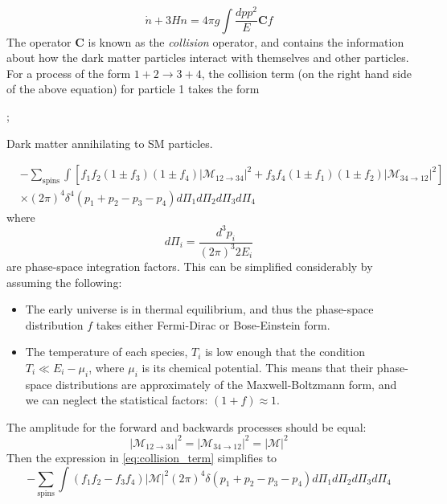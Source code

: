 \begin{equation}\label{eq:simplified_n_density}
  \dot{n}+3Hn = 4\pi g\int \frac{dpp^2}{E}\mathbf{C}f
\end{equation}
The operator \textbf{C} is known as the \emph{collision} operator, and contains the information about how the dark matter particles interact with themselves and other particles. For a process of the form $1+2\rightarrow 3+4$, the collision term (on the right hand side of the above equation) for particle 1 takes the form  
\begin{marginfigure}
  ;
  \label{fig:dm_annihilation}
  \caption{Dark matter annihilating to SM particles.}
\end{marginfigure}
\begin{equation}\label{eq:collision_term}
  \begin{split}
  &-\sum_\text{spins}\int [f_1 f_2(1\pm f_3)(1\pm f_4)|\mathcal{M}_{12\rightarrow 34}|^2 + f_3 f_4(1\pm f_1)(1\pm f_2)|\mathcal{M}_{34\rightarrow 12}|^2]\\
&\times(2\pi)^4\delta^4(p_1+p_2-p_3-p_4)d\Pi_1 d\Pi_2 d\Pi_3 d\Pi_4
\end{split}
\end{equation}
where
\[d\Pi_i = \frac{d^3 p_i}{(2\pi)^3 2E_i}\]
are phase-space integration factors. This can be simplified considerably by assuming the following:
\begin{itemize}
  \item The early universe is in thermal equilibrium, and thus the phase-space distribution $f$ takes either Fermi-Dirac or Bose-Einstein form.
  \item The temperature of each species, $T_i$ is low enough that the condition $T_i \ll E_i - \mu_i$, where $\mu_i$ is its chemical potential. This means that their phase-space distributions are approximately of the Maxwell-Boltzmann form, and we can neglect the statistical factors: $(1+f)\approx 1$.
\end{itemize}
The amplitude for the forward and backwards processes should be equal:
\[|\mathcal{M}_{12\rightarrow 34}|^2 = |\mathcal{M}_{34\rightarrow 12}|^2 = |\mathcal{M}|^2 \]
Then the expression in \autoref{eq:collision_term} simplifies to
\begin{equation}
-\sum_\text{spins}\int(f_1 f_2 - f_3 f_4)|\mathcal{M}|^2(2\pi)^4\delta(p_1 + p_2 - p_3 - p_4)d\Pi_1 d\Pi_2 d\Pi_3 d\Pi_4
\end{equation}
